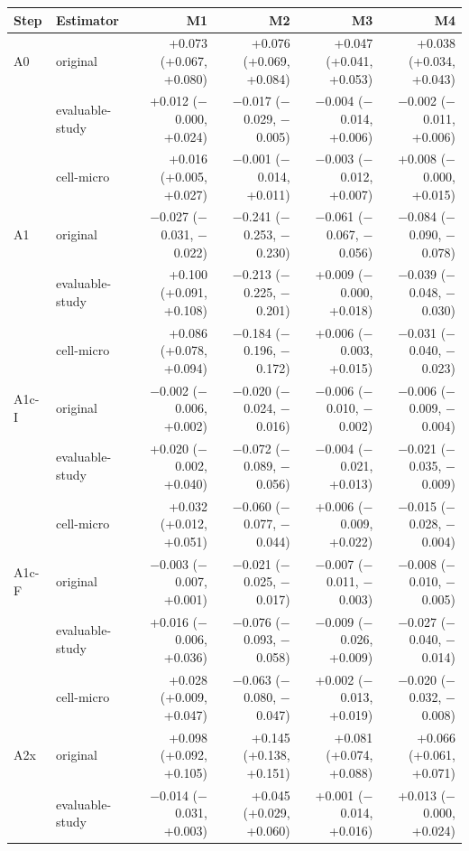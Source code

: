 \begin{longtable}{llrrrr}
\toprule
Step & Estimator & M1 & M2 & M3 & M4\\
\midrule
\endhead
A0 & original & +0.073 (+0.067, +0.080) & +0.076 (+0.069, +0.084) & +0.047 (+0.041, +0.053) & +0.038 (+0.034, +0.043)\\
 & evaluable-study & +0.012 ($-$0.000, +0.024) & $-$0.017 ($-$0.029, $-$0.005) & $-$0.004 ($-$0.014, +0.006) & $-$0.002 ($-$0.011, +0.006)\\
 & cell-micro & +0.016 (+0.005, +0.027) & $-$0.001 ($-$0.014, +0.011) & $-$0.003 ($-$0.012, +0.007) & +0.008 ($-$0.000, +0.015)\\
\midrule
A1 & original & $-$0.027 ($-$0.031, $-$0.022) & $-$0.241 ($-$0.253, $-$0.230) & $-$0.061 ($-$0.067, $-$0.056) & $-$0.084 ($-$0.090, $-$0.078)\\
 & evaluable-study & +0.100 (+0.091, +0.108) & $-$0.213 ($-$0.225, $-$0.201) & +0.009 ($-$0.000, +0.018) & $-$0.039 ($-$0.048, $-$0.030)\\
 & cell-micro & +0.086 (+0.078, +0.094) & $-$0.184 ($-$0.196, $-$0.172) & +0.006 ($-$0.003, +0.015) & $-$0.031 ($-$0.040, $-$0.023)\\
\midrule
A1c-I & original & $-$0.002 ($-$0.006, +0.002) & $-$0.020 ($-$0.024, $-$0.016) & $-$0.006 ($-$0.010, $-$0.002) & $-$0.006 ($-$0.009, $-$0.004)\\
 & evaluable-study & +0.020 ($-$0.002, +0.040) & $-$0.072 ($-$0.089, $-$0.056) & $-$0.004 ($-$0.021, +0.013) & $-$0.021 ($-$0.035, $-$0.009)\\
 & cell-micro & +0.032 (+0.012, +0.051) & $-$0.060 ($-$0.077, $-$0.044) & +0.006 ($-$0.009, +0.022) & $-$0.015 ($-$0.028, $-$0.004)\\
\midrule
A1c-F & original & $-$0.003 ($-$0.007, +0.001) & $-$0.021 ($-$0.025, $-$0.017) & $-$0.007 ($-$0.011, $-$0.003) & $-$0.008 ($-$0.010, $-$0.005)\\
 & evaluable-study & +0.016 ($-$0.006, +0.036) & $-$0.076 ($-$0.093, $-$0.058) & $-$0.009 ($-$0.026, +0.009) & $-$0.027 ($-$0.040, $-$0.014)\\
 & cell-micro & +0.028 (+0.009, +0.047) & $-$0.063 ($-$0.080, $-$0.047) & +0.002 ($-$0.013, +0.019) & $-$0.020 ($-$0.032, $-$0.008)\\
\midrule
A2x & original & +0.098 (+0.092, +0.105) & +0.145 (+0.138, +0.151) & +0.081 (+0.074, +0.088) & +0.066 (+0.061, +0.071)\\
 & evaluable-study & $-$0.014 ($-$0.031, +0.003) & +0.045 (+0.029, +0.060) & +0.001 ($-$0.014, +0.016) & +0.013 ($-$0.000, +0.024)\\

\end{longtable}
